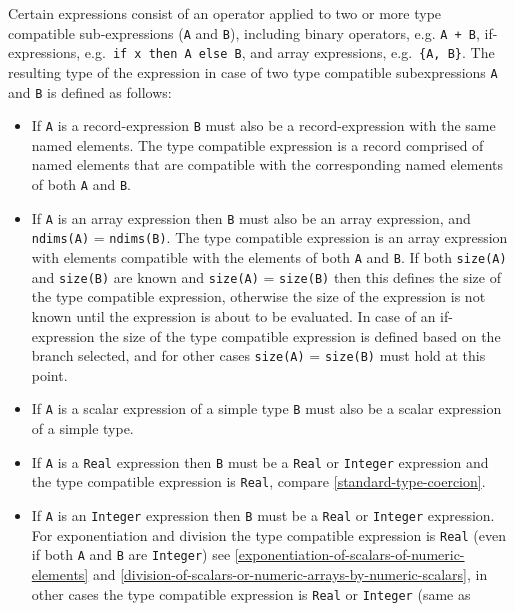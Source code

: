 Certain expressions consist of an operator applied to two or more type
compatible sub-expressions (\lstinline!A! and \lstinline!B!), including binary operators, e.g.
\lstinline!A + B!, if-expressions, e.g.\ \lstinline!if x then A else B!, and array expressions,
e.g.\ \lstinline!{A, B}!. The resulting type of the expression in case of two type
compatible subexpressions \lstinline!A! and \lstinline!B! is defined as follows:
\begin{itemize}
\item
  If \lstinline!A! is a record-expression \lstinline!B! must also be a record-expression with
  the same named elements. The type compatible expression is a record
  comprised of named elements that are compatible with the corresponding
  named elements of both \lstinline!A! and \lstinline!B!.
\item
  If \lstinline!A! is an array expression then \lstinline!B! must also be an array expression,
  and \lstinline!ndims(A)! = \lstinline!ndims(B)!. The type compatible expression is an array
  expression with elements compatible with the elements of both \lstinline!A! and \lstinline!B!.
  If both \lstinline!size(A)! and \lstinline!size(B)! are known
	and \lstinline!size(A)! = \lstinline!size(B)! then this
  defines the size of the type compatible expression, otherwise the size
  of the expression is not known until the expression is about to be
  evaluated. In case of an if-expression the size of the type compatible
  expression is defined based on the branch selected, and for other
  cases \lstinline!size(A)! = \lstinline!size(B)! must hold at this point.
\item
  If \lstinline!A! is a scalar expression of a simple type \lstinline!B! must also be a scalar
  expression of a simple type.
\item
  If \lstinline!A! is a \lstinline!Real! expression then \lstinline!B! must be a \lstinline!Real! or \lstinline!Integer! expression
  and the type compatible expression is \lstinline!Real!, compare \cref{standard-type-coercion}.
\item
  If \lstinline!A! is an \lstinline!Integer! expression then \lstinline!B! must be a \lstinline!Real! or \lstinline!Integer!
  expression. For exponentiation and division the type compatible
  expression is \lstinline!Real! (even if both \lstinline!A! and \lstinline!B! are \lstinline!Integer!) see \cref{exponentiation-of-scalars-of-numeric-elements}
  and \cref{division-of-scalars-or-numeric-arrays-by-numeric-scalars}, in
  other cases the type compatible expression is \lstinline!Real! or \lstinline!Integer! (same as

\end{itemize}
